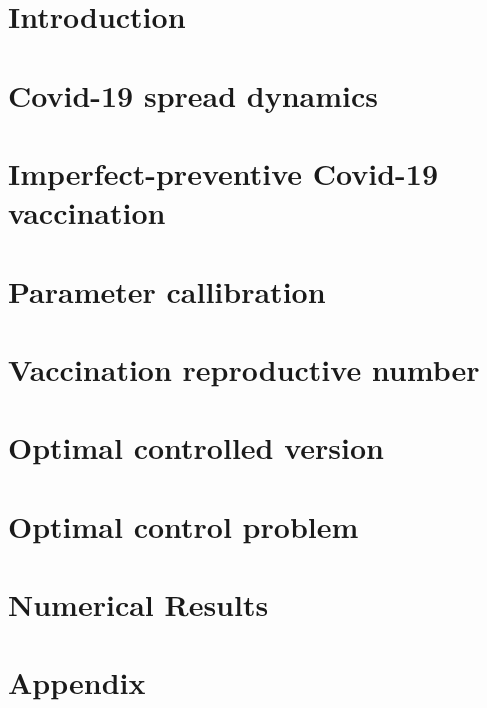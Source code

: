 \documentclass[5p, sort&compress]{elsarticle}
\begin{document}
  
  \section{Introduction}
    
  \section{Covid-19 spread dynamics}
    
  \section{Imperfect-preventive Covid-19 vaccination}
    
  \section{Parameter callibration}
    
  \section{Vaccination reproductive number}
  \section{Optimal controlled version}
    
  \section{Optimal control problem}
  \section{Numerical Results}
  \appendix
  \section{Appendix}
    
  \nocite{*}
  
  
\end{document}
